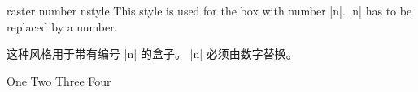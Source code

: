 \begin{docTcbKey}[][doc new=2014-11-10]{raster number n}{}{style}
This style is used for the box with number |n|.
|n| has to be replaced by a number.

这种风格用于带有编号 |n| 的盒子。 |n| 必须由数字替换。
\begin{dispExample}
\begin{tcbitemize}[size=small,colframe=red!50!black,colback=red!10!white,
raster number 4/.style={colframe=blue!50!black,colback=blue!10!white}]
\tcbitem One
\tcbitem Two
\tcbitem Three
\tcbitem Four
\end{tcbitemize}
\end{dispExample}
\end{docTcbKey}


